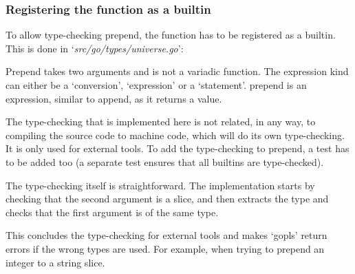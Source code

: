 \subsubsection{Registering the function as a builtin}

To allow type-checking prepend, the function has to be registered as a builtin.
This is done in `\textit{src/go/types/universe.go}':

\begin{code}
\end{code}

\begin{code}
\end{code}


Prepend takes two arguments and is not a variadic function. The expression kind can either be a `conversion',
`expression' or a `statement'.
prepend is an expression, similar to append, as it returns a value.

The type-checking that is implemented here is not related, in any way, to compiling
the source code to machine code, which will do its own type-checking. It is only
used for external tools.
To add the type-checking to prepend, a test has to be added too (a separate
test ensures that all builtins are type-checked).

\begin{code}
\end{code}

The type-checking itself is straightforward. The implementation starts by checking that the second
argument is a slice, and then extracts the type and checks that the first argument is of the same type.

\begin{code}
\end{code}

This concludes the type-checking for external tools and makes `gopls' return errors
if the wrong types are used. For example, when trying to prepend an integer to
a string slice.

